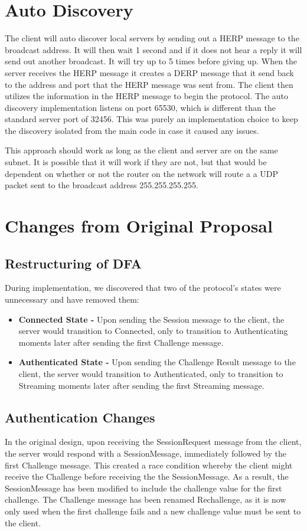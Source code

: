 \documentclass[12pt,letterpaper,titlepage]{article}
\begin{document}
\section{Auto Discovery}
\label{sec:autodiscovery}
The client will auto discover local servers by sending out a HERP message to the broadcast address. It will then wait 1 second and if it does not hear a reply it will send out another broadcast. It will try up to 5
times before giving up. When the server receives the HERP message it creates a DERP message that it send back to the address and port that the HERP message was sent from. The client then utilizes the information in the
HERP message to begin the protocol. The auto discovery implementation listens on port 65530,
which is different than the standard server port of 32456. This was purely an implementation 
choice to keep the discovery isolated from the main code in case it caused any issues. 

This approach should work as long as the client and server are on the same subnet. It is possible that it will work if they are not, but that would be dependent on whether or not the router on the network will route a
a UDP packet sent to the broadcast address 255.255.255.255.

\section{Changes from Original Proposal}
\subsection{Restructuring of DFA}
During implementation, we discovered that two of the protocol's states were unnecessary and have removed them:
\begin{itemize}
\item {\bf Connected State - }Upon sending the Session message to the client, the server would transition to Connected, only to transition to Authenticating moments later after sending the first Challenge message.
\item {\bf Authenticated State - }Upon sending the Challenge Result message to the client, the server would transition to Authenticated, only to transition to Streaming moments later after sending the first Streaming message.
\end{itemize}

\subsection{Authentication Changes}
In the original design, upon receiving the SessionRequest message from the client, the server would respond with a SessionMessage, immediately followed by the first Challenge message.  This created a race condition whereby the client might receive the Challenge before receiving the the SessionMessage.  As a result, the SessionMessage has been modified to include the challenge value for the first challenge.  The Challenge message has been renamed Rechallenge, as it is now only used when the first challenge fails and a new challenge value must be sent to the client. 
\end{document}
